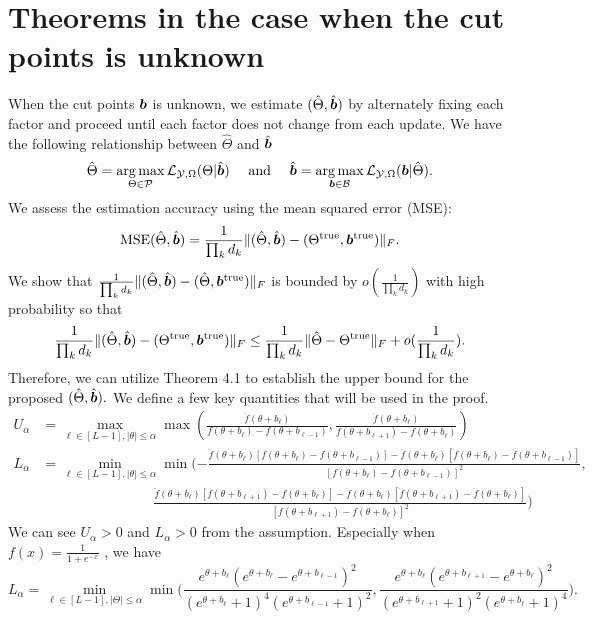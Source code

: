 \documentclass[11pt]{article}
\theoremstyle{plain}
\theoremstyle{definition}
\begin{document}
\section{Theorems in the case when the cut points is unknown}
When the cut points $\bm{b}$ is unknown, we estimate $(\hat\Theta,\hat{\bm{b}})$ by alternately fixing each factor and proceed until each factor does not change from each update. We have the following relationship between $\hat\Theta$ and $\hat{\bm{b}}$
\begin{equation}
  \begin{aligned}
    \hat\Theta = \operatorname*{arg\,max}_{\Theta\in \mathcal{P}} \mathcal{L}_{\mathcal{Y},\Omega} (\Theta|\hat{\bm{b}})\quad \text{ and }\quad \hat{\bm{b}} = \operatorname*{arg\,max}_{\bm{b}\in \mathcal{B}}\mathcal{L}_{\mathcal{Y},\Omega}(\bm{b}|\hat\Theta).
  \end{aligned}
\end{equation}
We assess the estimation accuracy using the mean squared error (MSE):
$$\text{MSE}(\hat\Theta,\hat{\bm{b}}) = \frac{1}{\prod_k d_k}\lVert(\hat\Theta,\hat{\bm{b}})-(\Theta^{\text{true}},\bm{b}^{\text{true}})\rVert_F. $$
We show that $\frac{1}{\prod_k d_k}\lVert(\hat\Theta,\hat{\bm{b}})-(\hat\Theta,\bm{b}^{\text{true}})\rVert_F $ is bounded by $o(\frac{1}{\prod_k d_k})$ with high probability so that $$ \frac{1}{\prod_k d_k}\lVert(\hat\Theta,\hat{\bm{b}})-(\Theta^{\text{true}},\bm{b}^{\text{true}})\rVert_F \leq \frac{1}{\prod_k d_k}\lVert\hat\Theta-\Theta^{\text{true}}\rVert_F + o(\frac{1}{\prod_k d_k}).$$
Therefore, we can utilize Theorem 4.1 to establish the upper bound for the proposed $(\hat\Theta,\hat{\bm{b}}).$
We define a few key quantities that will be used in the proof.
\begin{align}
 U_\alpha &= \max_{\ell\in[L-1],|\theta|\leq \alpha} \max(\frac{\dot{f}(\theta+b_\ell)}{f(\theta+b_\ell)-f(
\theta+b_{\ell-1})},\frac{\dot{f}(\theta+b_\ell)}{f(\theta+b_{\ell+1})-f(
\theta+b_{\ell})})\\
L_\alpha & = \min_{\ell\in[L-1],|\theta|\leq \alpha} \min(-\frac{\ddot{f}(\theta+b_\ell)[f(\theta+b_\ell)-f(\theta+b_{\ell-1})]-\dot{f}(\theta+b_\ell)[\dot{f}(\theta+b_\ell)-\dot{f}(\theta+b_{\ell-1})]}{[f(\theta+b_\ell)-f(\theta+b_{\ell-1})]^2},
\\ &\hspace{1in}\qquad\frac{\ddot{f}(\theta+b_\ell)[f(\theta+b_{\ell+1})-f(\theta+b_{\ell})]-\dot{f}(\theta+b_\ell)[\dot{f}(\theta+b_{\ell+1})-\dot{f}(\theta+b_{\ell})]}{[f(\theta+b_{\ell+1})-f(\theta+b_{\ell})]^2})
\end{align}
We can see $U_\alpha>0$ and $L_\alpha>0$ from the assumption. Especially when $f(x) = \frac{1}{1+e^{-x}}$ , we have $$L_\alpha = \min_{\ell\in[L-1],|\Theta|\leq\alpha}\min\bigg(\frac{e^{\theta+b_\ell} (e^{\theta+b_\ell} - e^{\theta+b_{\ell-1}})^2}{(e^{\theta+b_\ell} + 1)^4 (e^{\theta+b_{\ell-1}} + 1)^2},\frac{e^{\theta+b_\ell} (e^{\theta+b_{\ell+1}} - e^{\theta+b_\ell})^2}{(e^{\theta+b_{\ell+1}} + 1)^2 (e^{\theta+b_\ell} + 1)^4}\bigg).$$
\end{document}

